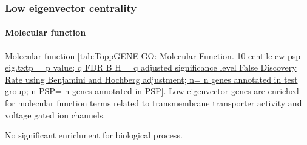 \clearpage
\subsubsection{Low eigenvector centrality}
\paragraph{Molecular function}

Molecular function \ref{tab:ToppGENE GO: Molecular Function. 10 centile cw psp eig.txtp = p value; q FDR B H = q adjusted significance level False Discovery Rate using Benjamini and Hochberg adjustment; n= n genes annotated in test group; n PSP= n genes annotated in PSP}. Low eigenvector genes are enriched for molecular function terms related to transmembrane transporter activity and voltage gated ion channels. 

No significant enrichment for biological process. 

